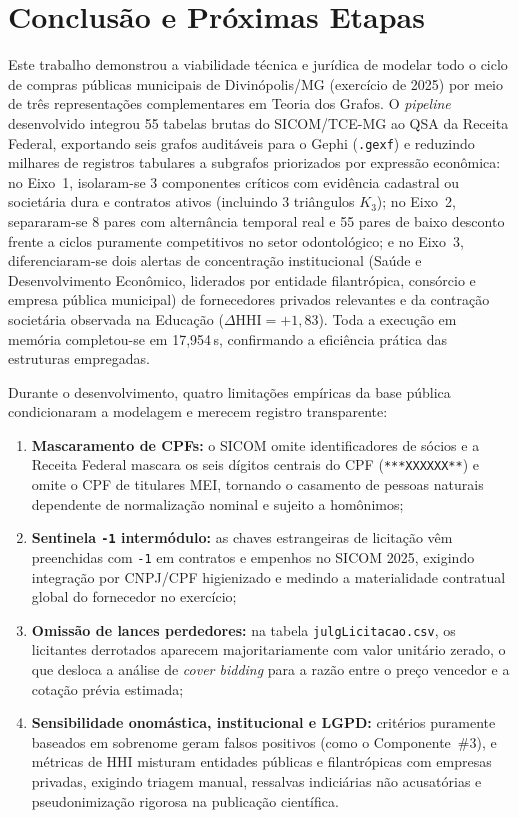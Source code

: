 \section{Conclusão e Próximas Etapas}
\label{sec:conclusao}

Este trabalho demonstrou a viabilidade técnica e jurídica de modelar todo o ciclo de compras públicas municipais de Divinópolis/MG (exercício de 2025) por meio de três representações complementares em Teoria dos Grafos. O \textit{pipeline} desenvolvido integrou 55 tabelas brutas do SICOM/TCE-MG ao QSA da Receita Federal, exportando seis grafos auditáveis para o Gephi (\texttt{.gexf}) e reduzindo milhares de registros tabulares a subgrafos priorizados por expressão econômica: no Eixo~1, isolaram-se 3 componentes críticos com evidência cadastral ou societária dura e contratos ativos (incluindo 3 triângulos $K_3$); no Eixo~2, separaram-se 8 pares com alternância temporal real e 55 pares de baixo desconto frente a ciclos puramente competitivos no setor odontológico; e no Eixo~3, diferenciaram-se dois alertas de concentração institucional (Saúde e Desenvolvimento Econômico, liderados por entidade filantrópica, consórcio e empresa pública municipal) de fornecedores privados relevantes e da contração societária observada na Educação ($\Delta\text{HHI}=+1{,}83$). Toda a execução em memória completou-se em 17,954\,s, confirmando a eficiência prática das estruturas empregadas.

Durante o desenvolvimento, quatro limitações empíricas da base pública condicionaram a modelagem e merecem registro transparente:
\begin{enumerate}
  \item \textbf{Mascaramento de CPFs:} o SICOM omite identificadores de sócios e a Receita Federal mascara os seis dígitos centrais do CPF (\texttt{***XXXXXX**}) e omite o CPF de titulares MEI, tornando o casamento de pessoas naturais dependente de normalização nominal e sujeito a homônimos;
  \item \textbf{Sentinela \texttt{-1} intermódulo:} as chaves estrangeiras de licitação vêm preenchidas com \texttt{-1} em contratos e empenhos no SICOM 2025, exigindo integração por CNPJ/CPF higienizado e medindo a materialidade contratual global do fornecedor no exercício;
  \item \textbf{Omissão de lances perdedores:} na tabela \texttt{julg\allowbreak Licitacao.csv}, os licitantes derrotados aparecem majoritariamente com valor unitário zerado, o que desloca a análise de \textit{cover bidding} para a razão entre o preço vencedor e a cotação prévia estimada;
  \item \textbf{Sensibilidade onomástica, institucional e LGPD:} critérios puramente baseados em sobrenome geram falsos positivos (como o Componente~\#3), e métricas de HHI misturam entidades públicas e filantrópicas com empresas privadas, exigindo triagem manual, ressalvas indiciárias não acusatórias e pseudonimização rigorosa na publicação científica.
\end{enumerate}


